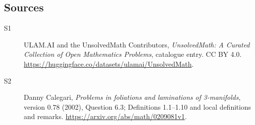 \documentclass[11pt]{article}
\begin{document}
\subsection{Sources}
\begin{description}
\item[\hypertarget{source:statement:1}{S1}] ULAM.AI and the UnsolvedMath Contributors, \emph{UnsolvedMath: A Curated Collection of Open Mathematics Problems}, catalogue entry. CC BY 4.0. \url{https://huggingface.co/datasets/ulamai/UnsolvedMath}.
\item[\hypertarget{source:statement:2}{S2}] Danny Calegari, \emph{Problems in foliations and laminations of 3-manifolds}, version 0.78 (2002), Question 6.3; Definitions 1.1--1.10 and local definitions and remarks. \url{https://arxiv.org/abs/math/0209081v1}.
\end{description}
\label{end:statement}
\end{document}
